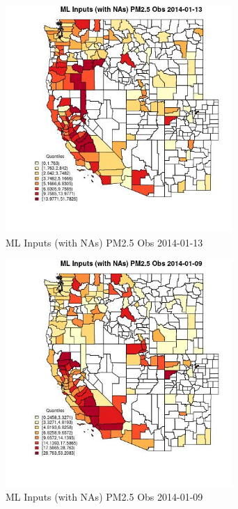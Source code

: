 \begin{figure} 
\centering  
\includegraphics[width=0.77\textwidth]{Code_Outputs/Report_ML_input_PM25_Step4_part_e_de_duplicated_aveswNAs_CountyPM25_ObsMean2014-01-13_2014-01-13.jpg} 
\caption{\label{fig:Report_ML_input_PM25_Step4_part_e_de_duplicated_aveswNAsCountyPM25_ObsMean2014-01-13_2014-01-13}ML Inputs (with NAs) PM2.5 Obs 2014-01-13} 
\end{figure} 
 

\begin{figure} 
\centering  
\includegraphics[width=0.77\textwidth]{Code_Outputs/Report_ML_input_PM25_Step4_part_e_de_duplicated_aveswNAs_CountyPM25_ObsMean2014-01-09_2014-01-09.jpg} 
\caption{\label{fig:Report_ML_input_PM25_Step4_part_e_de_duplicated_aveswNAsCountyPM25_ObsMean2014-01-09_2014-01-09}ML Inputs (with NAs) PM2.5 Obs 2014-01-09} 
\end{figure} 
 

